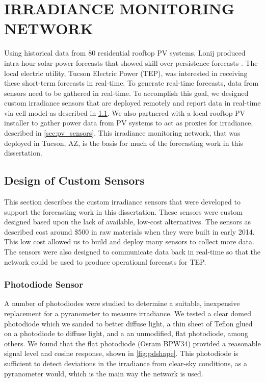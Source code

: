 \chapter{IRRADIANCE MONITORING NETWORK}
\label{chap:sens_net}

Using historical data from 80 residential rooftop PV systems, Lonij
\etal produced intra-hour solar power forecasts that showed skill over
persistence forecasts \citep{Lonij2013}.
The local electric utility, Tucson Electric Power (TEP), was interested in
receiving these short-term forecasts in real-time.
To generate real-time forecasts, data from sensors need to be gathered
in real-time.
To accomplish this goal, we designed custom irradiance sensors that
are deployed remotely and report data in real-time via cell model as
described in \cref{sec:custom_sensors}.
We also partnered with a local rooftop PV installer to gather power
data from PV systems to act as proxies for irradiance, described in
\cref{sec:pv_sensors}.
This irradiance monitoring network, that was deployed in Tucson, AZ, is
the basis for much of the forecasting work in this dissertation.


\section{Design of Custom Sensors}
\label{sec:custom_sensors}
This section describes the custom irradiance sensors that were
developed to support the forecasting work in this dissertation.
These sensors were custom designed based upon the lack of available,
low-cost alternatives.
The sensors as described cost around \$500 in raw materials when they
were built in early 2014.
This low cost allowed us to build and deploy many sensors to collect
more data.
The sensors were also designed to communicate data back in real-time
so that the network could be used to produce operational forecasts for
TEP.

\subsection{Photodiode Sensor}
\label{sec:photodiode}
A number of photodiodes were studied to determine a suitable,
inexpensive replacement for a pyranometer to measure irradiance.
We tested a clear domed photodiode which we sanded to better diffuse
light, a thin sheet of Teflon glued on a photodiode to diffuse light,
and a an unmodified, flat photodiode, among others.
We found that the flat photodiode (Osram BPW34) provided a reasonable
signal level and cosine response, shown in \cref{fig:pdshape}.
This photodiode is sufficient to detect deviations in the irradiance from
clear-sky conditions, as a pyranometer would, which is the main way
the network is used.

